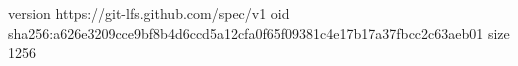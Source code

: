 version https://git-lfs.github.com/spec/v1
oid sha256:a626e3209cce9bf8b4d6ccd5a12cfa0f65f09381c4e17b17a37fbcc2c63aeb01
size 1256
